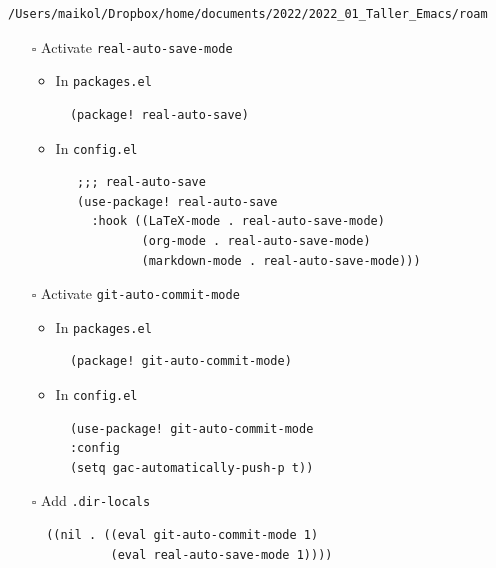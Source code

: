 \documentclass[11pt]{article}
\begin{document}
\begin{verbatim}
/Users/maikol/Dropbox/home/documents/2022/2022_01_Taller_Emacs/roam
\end{verbatim}


\begin{itemize}
\item[{$\square$}] Activate \texttt{real-auto-save-mode}
\begin{itemize}
\item In \texttt{packages.el}
\begin{verbatim}
  (package! real-auto-save)
\end{verbatim}
\item In \texttt{config.el}
\begin{verbatim}
   ;;; real-auto-save
   (use-package! real-auto-save
     :hook ((LaTeX-mode . real-auto-save-mode)
            (org-mode . real-auto-save-mode)
            (markdown-mode . real-auto-save-mode)))
\end{verbatim}
\end{itemize}

\item[{$\square$}] Activate \texttt{git-auto-commit-mode}
\begin{itemize}
\item In \texttt{packages.el}
\begin{verbatim}
  (package! git-auto-commit-mode)
\end{verbatim}
\item In \texttt{config.el}
\begin{verbatim}
  (use-package! git-auto-commit-mode
  :config
  (setq gac-automatically-push-p t))
\end{verbatim}
\end{itemize}
\item[{$\square$}] Add \texttt{.dir-locals}
\begin{verbatim}
  ((nil . ((eval git-auto-commit-mode 1)
           (eval real-auto-save-mode 1))))
\end{verbatim}
\end{itemize}
\end{document}
